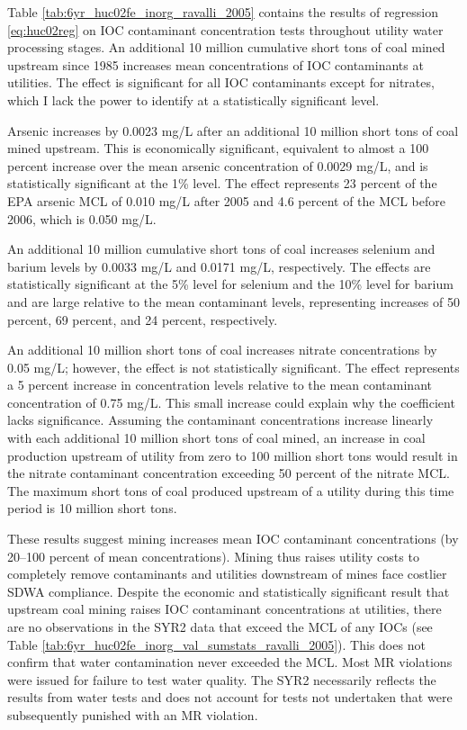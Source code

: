 \documentclass{article}
\begin{document}


Table \ref{tab:6yr_huc02fe_inorg_ravalli_2005} contains the results of regression \ref{eq:huc02reg} on IOC contaminant concentration tests throughout utility water processing stages. An additional 10 million cumulative short tons of coal mined upstream since 1985 increases mean concentrations of IOC contaminants at utilities. The effect is significant for all IOC contaminants except for nitrates, which I lack the power to identify at a statistically significant level.

Arsenic increases by 0.0023 mg/L after an additional 10 million short tons of coal mined upstream. This is economically significant, equivalent to almost a 100 percent increase over the mean arsenic concentration of 0.0029 mg/L, and is statistically significant at the 1\% level. The effect represents 23 percent of the EPA arsenic MCL of 0.010 mg/L after 2005 and 4.6 percent of the MCL before 2006, which is 0.050 mg/L.

An additional 10 million cumulative short tons of coal increases selenium and barium levels by 0.0033 mg/L and 0.0171 mg/L, respectively. The effects are statistically significant at the 5\% level for selenium and the 10\% level for barium and are large relative to the mean contaminant levels, representing increases of 50 percent, 69 percent, and 24 percent, respectively.

An additional 10 million short tons of coal increases nitrate concentrations by 0.05 mg/L; however, the effect is not statistically significant. The effect represents a 5 percent increase in concentration levels relative to the mean contaminant concentration of 0.75 mg/L. This small increase could explain why the coefficient lacks significance. Assuming the contaminant concentrations increase linearly with each additional 10 million short tons of coal mined, an increase in coal production upstream of utility from zero to 100 million short tons would result in the nitrate contaminant concentration exceeding 50 percent of the nitrate MCL. The maximum short tons of coal produced upstream of a utility during this time period is 10 million short tons. 

These results suggest mining increases mean IOC contaminant concentrations (by 20--100 percent
of mean concentrations). Mining thus raises utility costs to completely remove contaminants and utilities downstream of mines face costlier SDWA compliance. Despite the economic and statistically significant result that upstream coal mining raises IOC contaminant concentrations at utilities, there are no observations in the SYR2 data that exceed the MCL of any IOCs (see Table \ref{tab:6yr_huc02fe_inorg_val_sumstats_ravalli_2005}). This does not confirm that water contamination never exceeded the MCL. Most MR violations were issued for failure to test water quality. The SYR2 necessarily reflects the results from water tests and does not account for tests not undertaken that were subsequently punished with an MR violation.
\end{document}
